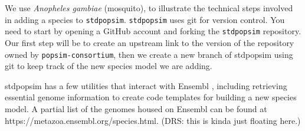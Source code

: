 \documentclass[hidelinks]{article}
\providecommand{\tightlist}{%
\setlength{\itemsep}{0pt}\setlength{\parskip}{0pt}}
\begin{document}
We use \emph{Anopheles gambiae} (mosquito), to illustrate the technical steps involved in adding a species to \texttt{stdpopsim}. 
%
%
%
%
\texttt{stdpopsim} uses git for version control. You need to start by opening a GitHub account and forking the \texttt{stdpopsim} repository. Our first step will be to create an upstream
link to the version of the repository owned by
\texttt{popsim-consortium}, then we create a new branch of stdpopsim
using git to keep track of the new species model we are adding.

stdpopsim has a few utilities that interact with Ensembl \citep{ensembl2021},
including retrieving essential genome information to create code
templates for building a new species model. A partial list of the
genomes housed on Ensembl can be found at
https://metazoa.ensembl.org/species.html. (DRS: this is kinda just floating here.)
\end{document}
